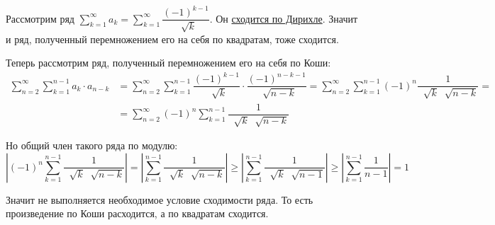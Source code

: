 \documentclass[../main.tex]{subfiles}
\begin{document}
\begin{example}

    ~
    
    Рассмотрим ряд \( \sum\limits_{ k=1}^{ \infty } a_k=\sum\limits_{ k=1}^{ \infty } \dfrac{ \left(-1\right)^{k-1}}{ \;\sqrt[]{k}} \). Он \hyperlink{thm:series_dirihle}{сходится по Дирихле}. Значит и ряд, полученный перемножением его на себя по квадратам, тоже сходится. 
    
    Теперь рассмотрим ряд, полученный перемножением его на себя по Коши: 
    \begin{equation*}
        \begin{aligned}
             \sum\limits_{ n=2}^{ \infty } \sum\limits_{ k=1}^{ n-1} a_k\cdot a_{n-k}&= \sum\limits_{ n=2}^{ \infty } \sum\limits_{ k=1}^{ n-1} \dfrac{ (-1)^{k-1}}{ \;\sqrt[]{k}}\cdot \dfrac{ (-1)^{n-k-1}}{ \;\sqrt[]{n-k}}= \sum\limits_{ n=2}^{ \infty } \sum\limits_{ k=1}^{ n-1} \left( -1\right)^n \dfrac{ 1}{ \;\sqrt[]{k} \;\sqrt[]{n-k}}= \\ 
            & = \sum\limits_{ n=2}^{ \infty } \left( -1\right)^n \sum\limits_{ k=1}^{ n-1} \dfrac{ 1}{ \;\sqrt[]{k} \;\sqrt[]{n-k}}
        \end{aligned}
    \end{equation*}

    Но общий член такого ряда по модулю:
    \[ \left| \left( -1\right)^n \sum\limits_{ k=1}^{ n-1} \dfrac{ 1}{ \;\sqrt[]{k} \;\sqrt[]{n-k}}\right| = \left| \sum\limits_{ k=1}^{ n-1} \dfrac{ 1}{ \;\sqrt[]{k} \;\sqrt[]{n-k}}\right| \geq \left| \sum\limits_{ k=1}^{ n-1} \dfrac{ 1}{ \;\sqrt[]{k} \;\sqrt[]{n-1}} \right| \geq \left| \sum\limits_{ k=1}^{ n-1} \dfrac{ 1}{ n-1} \right|=1\]

    Значит не выполняется необходимое условие сходимости ряда. То есть произведение по Коши расходится, а по квадратам сходится. 
\end{example}
\end{document}
